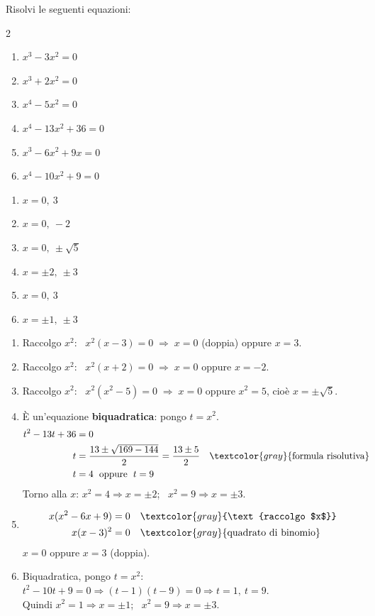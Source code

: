 \begin{question}[ID=4.2, subtitle={Equazioni di grado superiore al secondo}, difficulty=facile, tags={equazioni di grado superiore}]
Risolvi le seguenti equazioni:
\begin{multicols}{2}
\begin{enumerate}[leftmargin=3cm]
    \item $x^3 - 3x^2 = 0$
    \item $x^3 + 2x^2 = 0$
    \item $x^4 - 5x^2 = 0$
    \item $x^4 - 13x^2 + 36 = 0$
    \item $x^3 - 6x^2 + 9x = 0$
    \item $x^4 - 10x^2 + 9 = 0$
\end{enumerate}
\end{multicols}
\begin{solution}
\begin{enumerate}
    \item $x=0,\ 3$
    \item $x=0,\ -2$
    \item $x=0,\ \pm\sqrt5$
    \item $x=\pm2,\ \pm3$
    \item $x=0,\ 3$
    \item $x=\pm1,\ \pm3$
\end{enumerate}
\end{solution}
\begin{explanation}
\begin{enumerate}
    \item Raccolgo $x^2$: \ $x^2(x-3)=0 \;\Rightarrow\; x=0$ (doppia) oppure $x=3$.
    \item Raccolgo $x^2$: \ $x^2(x+2)=0 \;\Rightarrow\; x=0$ oppure $x=-2$.
    \item Raccolgo $x^2$: \ $x^2(x^2-5)=0 \;\Rightarrow\; x=0$ oppure $x^2=5$, cioè $x=\pm\sqrt5$.
    \item È un'equazione \textbf{biquadratica}: pongo $t=x^2$.
    \[\begin{aligned}
    t^2-13t+36 &= 0\\
    t &= \dfrac{13\pm\sqrt{169-144}}{2}=\dfrac{13\pm5}{2} && \textcolor{gray}{\text{formula risolutiva}}\\
    t &= 4 \;\text{ oppure }\; t=9
    \end{aligned}\]
    Torno alla $x$: $x^2=4 \Rightarrow x=\pm2$; \ $x^2=9 \Rightarrow x=\pm3$.
    \item \[\begin{aligned}
    x(x^2-6x+9) &= 0 && \textcolor{gray}{\text{raccolgo $x$}}\\
    x(x-3)^2 &= 0 && \textcolor{gray}{\text{quadrato di binomio}}
    \end{aligned}\]
    $x=0$ oppure $x=3$ (doppia).
    \item Biquadratica, pongo $t=x^2$: \ $t^2-10t+9=0 \Rightarrow (t-1)(t-9)=0 \Rightarrow t=1,\ t=9$. \\
    Quindi $x^2=1 \Rightarrow x=\pm1$; \ $x^2=9 \Rightarrow x=\pm3$.
\end{enumerate}
\end{explanation}
\end{question}

